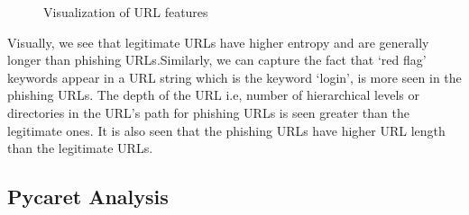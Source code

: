 \documentclass[conference]{IEEEtran}
\begin{document}
\begin{figure}[H]
  \centering
  \hfill
  \label{fig:bothfigures}
\end{figure}

\begin{figure}[H]
  \centering
  \hfill
  \caption{Visualization of URL features}
  \label{fig:bothfigures}
\end{figure}

\par Visually, we see that legitimate URLs have higher entropy and are generally longer than phishing URLs.Similarly, we can capture the fact that ‘red flag’ keywords appear in a URL string which is the keyword ‘login’, is more seen in the phishing URLs. The depth of the URL i.e, number of hierarchical levels or directories in the URL’s path for phishing URLs is seen greater than the legitimate ones. It is also seen that the phishing URLs have higher URL length than the legitimate URLs.
\subsection{Pycaret Analysis}
\end{document}
